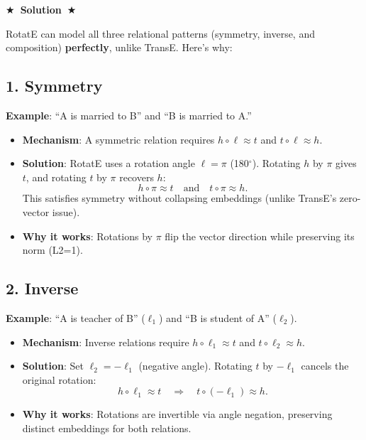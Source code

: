 \documentclass[11pt]{article}
\numberwithin{figure}{section}
\newcommand{\Solution}[1]{{\medskip \color{red} \bf $\bigstar$~\sf \textbf{Solution}~$\bigstar$ \sf #1 } \bigskip}
\begin{document}
\Solution{}

RotatE can model all three relational patterns (symmetry, inverse, and composition) \textbf{perfectly}, unlike TransE. Here's why:

\subsection*{1. Symmetry}
\textbf{Example}: ``A is married to B'' and ``B is married to A.''
\begin{itemize}
    \item \textbf{Mechanism}: A symmetric relation requires $h \circ \ell \approx t$ and $t \circ \ell \approx h$.
    \item \textbf{Solution}: RotatE uses a rotation angle $\ell = \pi$ (180$^\circ$). Rotating $h$ by $\pi$ gives $t$, and rotating $t$ by $\pi$ recovers $h$:
    \[
    h \circ \pi \approx t \quad \text{and} \quad t \circ \pi \approx h.
    \]
    This satisfies symmetry without collapsing embeddings (unlike TransE’s zero-vector issue).
    \item \textbf{Why it works}: Rotations by $\pi$ flip the vector direction while preserving its norm (L2=1).
\end{itemize}

\subsection*{2. Inverse}
\textbf{Example}: ``A is teacher of B'' ($\ell_1$) and ``B is student of A'' ($\ell_2$).
\begin{itemize}
    \item \textbf{Mechanism}: Inverse relations require $h \circ \ell_1 \approx t$ and $t \circ \ell_2 \approx h$.
    \item \textbf{Solution}: Set $\ell_2 = -\ell_1$ (negative angle). Rotating $t$ by $-\ell_1$ cancels the original rotation:
    \[
    h \circ \ell_1 \approx t \quad \Rightarrow \quad t \circ (-\ell_1) \approx h.
    \]
    \item \textbf{Why it works}: Rotations are invertible via angle negation, preserving distinct embeddings for both relations.
\end{itemize}
\end{document}
